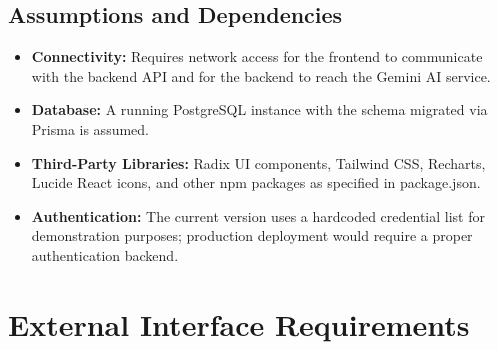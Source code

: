 \documentclass[12pt,a4paper]{report}
\begin{document}
\section{Assumptions and Dependencies}
\begin{itemize}
    \item \textbf{Connectivity:} Requires network access for the frontend to communicate with the backend API and for the backend to reach the Gemini AI service.
    \item \textbf{Database:} A running PostgreSQL instance with the schema migrated via Prisma is assumed.
    \item \textbf{Third-Party Libraries:} Radix UI components, Tailwind CSS, Recharts, Lucide React icons, and other npm packages as specified in package.json.
    \item \textbf{Authentication:} The current version uses a hardcoded credential list for demonstration purposes; production deployment would require a proper authentication backend.
\end{itemize}

\chapter{External Interface Requirements}
\end{document}
